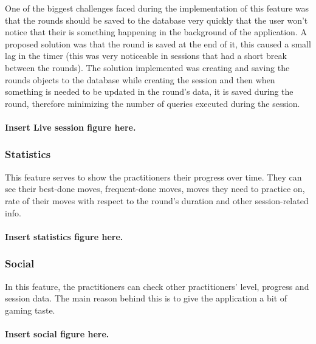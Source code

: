 \documentclass[a4paper]{article}
\begin{document}
One of the biggest challenges faced during the implementation of this feature was that the rounds should be saved to the database very quickly that the user won't notice that their is something happening in the background of the application. A proposed solution was that the round is saved at the end of it, this caused a small lag in the timer (this was very noticeable in sessions that had a short break between the rounds). The solution implemented was creating and saving the rounds objects to the database while creating the session and then when something is needed to be updated in the round's data, it is saved during the round, therefore minimizing the number of queries executed during the session.

\paragraph*{Insert Live session figure here.}

\subsubsection{Statistics}

This feature serves to show the practitioners their progress over time. They can see their best-done moves, frequent-done moves, moves they need to practice on, rate of their moves with respect to the round's duration and other session-related info.

\paragraph*{Insert statistics figure here.}

\subsubsection{Social}

In this feature, the practitioners can check other practitioners' level, progress and session data. The main reason behind this is to give the application a bit of gaming taste.

\paragraph*{Insert social figure here.}
\end{document}
